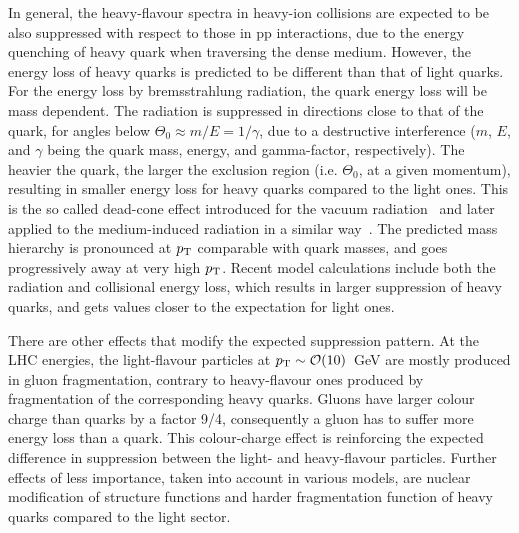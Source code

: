 In general, the heavy-flavour spectra in heavy-ion collisions are expected to be also suppressed with respect to those in pp interactions, due to the energy quenching of heavy quark when traversing the dense medium. However, the energy loss of heavy quarks is predicted to be different than that of light quarks. For the energy loss by bremsstrahlung radiation, the quark energy loss will be mass dependent. The radiation is suppressed in directions close to that of the quark, for angles below $\Theta_0 \approx m/E = 1/\gamma$, due to a destructive interference ($m$, $E$, and $\gamma$ being the quark mass, energy, and gamma-factor, respectively). The heavier the quark, the larger the exclusion region (i.e. $\Theta_0$, at a given momentum), resulting in smaller energy loss for heavy quarks compared to the light ones. This is the so called dead-cone effect introduced for the vacuum radiation~\cite{} and later applied to the medium-induced radiation in a similar way~\cite{}. The predicted mass hierarchy is pronounced at $p_{\rm T}$ comparable with quark masses, and goes progressively away at very high $p_{\rm T}$. Recent model calculations include both the radiation and collisional energy loss, which results in larger suppression of heavy quarks, and gets values closer to the expectation for light ones.

There are other effects that modify the expected suppression pattern. At the LHC energies, the light-flavour particles at $p_{\rm T} \sim {\cal O}(10)$~GeV are mostly produced in gluon fragmentation, contrary to heavy-flavour ones produced by fragmentation of the corresponding heavy quarks. Gluons have larger colour charge than quarks by a factor 9/4, consequently a gluon has to suffer more energy loss than a quark. This colour-charge effect is reinforcing the expected difference in suppression between the light- and heavy-flavour particles. Further effects of less importance, taken into account in various models, are nuclear modification of structure functions and harder fragmentation function of heavy quarks compared to the light sector.

